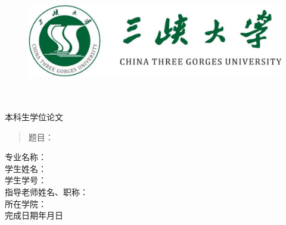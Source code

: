 % 

\thispagestyle{empty}
\begin{figure}[t]
    \centering
    \includegraphics{pics/icon.jpg}
\end{figure}
\begin{center}
    \quad \\
    \quad \\
    \heiti \fontsize{40pt}{48pt} 本科生学位论文
    \vspace{30mm}
\end{center}
\begin{quotation}
    {\heiti{}
        题目：
    }
\end{quotation}
\vspace{30mm}
\begin{center}
    \heiti\fontsize{15}{18}
    专\qquad{}业\qquad{}名\qquad{}称：\underline{\hspace{60mm}}\vspace{4mm}\\
    学\qquad{}生\qquad{}姓\qquad{}名：\underline{\hspace{60mm}}\vspace{4mm}\\
    学\qquad{}生\qquad{}学\qquad{}号：\underline{\hspace{60mm}}\vspace{4mm}\\
    指导老师姓名、职称：\underline{\hspace{56mm}}\vspace{4mm}\\
    所\qquad{}在\qquad{}学\qquad{}院：\underline{\hspace{60mm}}\vspace{4mm}\\
    \vspace{15mm}
    {\centering 完成日期\qquad{}\quad{}\qquad{}年\qquad{}月\qquad{}日}
\end{center}
\clearpage

% 